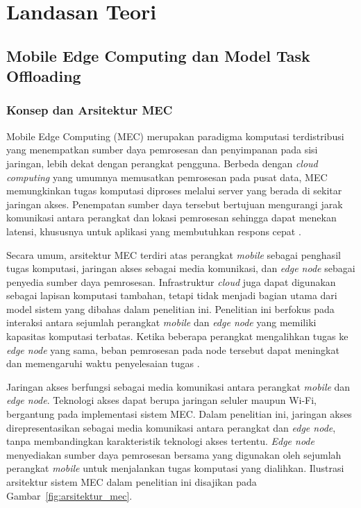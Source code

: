 \chapter{Landasan Teori}

\section{Mobile Edge Computing dan Model Task Offloading}
\label{sec:mobile_edge_computing_dan_model_task_offloading}

\subsection{Konsep dan Arsitektur MEC}
\label{subsec:konsep_dan_arsitektur_mec}

Mobile Edge Computing (MEC) merupakan paradigma komputasi terdistribusi yang menempatkan sumber daya pemrosesan dan penyimpanan pada sisi jaringan, lebih dekat dengan perangkat pengguna. Berbeda dengan \textit{cloud computing} yang umumnya memusatkan pemrosesan pada pusat data, MEC memungkinkan tugas komputasi diproses melalui server yang berada di sekitar jaringan akses. Penempatan sumber daya tersebut bertujuan mengurangi jarak komunikasi antara perangkat dan lokasi pemrosesan sehingga dapat menekan latensi, khususnya untuk aplikasi yang membutuhkan respons cepat \cite{yousefpour2019all, mach2017mobile, mao2017survey}.

Secara umum, arsitektur MEC terdiri atas perangkat \textit{mobile} sebagai penghasil tugas komputasi, jaringan akses sebagai media komunikasi, dan \textit{edge node} sebagai penyedia sumber daya pemrosesan. Infrastruktur \textit{cloud} juga dapat digunakan sebagai lapisan komputasi tambahan, tetapi tidak menjadi bagian utama dari model sistem yang dibahas dalam penelitian ini. Penelitian ini berfokus pada interaksi antara sejumlah perangkat \textit{mobile} dan \textit{edge node} yang memiliki kapasitas komputasi terbatas. Ketika beberapa perangkat mengalihkan tugas ke \textit{edge node} yang sama, beban pemrosesan pada node tersebut dapat meningkat dan memengaruhi waktu penyelesaian tugas \cite{tang2022deep, mach2017mobile}.

Jaringan akses berfungsi sebagai media komunikasi antara perangkat \textit{mobile} dan \textit{edge node}. Teknologi akses dapat berupa jaringan seluler maupun Wi-Fi, bergantung pada implementasi sistem MEC. Dalam penelitian ini, jaringan akses direpresentasikan sebagai media komunikasi antara perangkat dan \textit{edge node}, tanpa membandingkan karakteristik teknologi akses tertentu. \textit{Edge node} menyediakan sumber daya pemrosesan bersama yang digunakan oleh sejumlah perangkat \textit{mobile} untuk menjalankan tugas komputasi yang dialihkan. Ilustrasi arsitektur sistem MEC dalam penelitian ini disajikan pada Gambar~\ref{fig:arsitektur_mec}.

